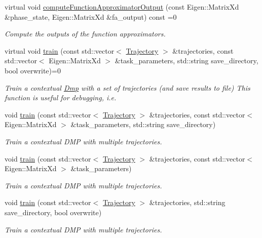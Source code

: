 \begin{DoxyCompactItemize}
virtual void \hyperlink{classDmpBbo_1_1DmpContextual_a768d6c4c35c804556afba0930cb25936}{compute\+Function\+Approximator\+Output} (const Eigen\+::\+Matrix\+Xd \&phase\+\_\+state, Eigen\+::\+Matrix\+Xd \&fa\+\_\+output) const =0
\begin{DoxyCompactList}\small\item\em Compute the outputs of the function approximators. \end{DoxyCompactList}\item 
virtual void \hyperlink{classDmpBbo_1_1DmpContextual_a08b158b7245e7fad5f187b4f2e3917d2}{train} (const std\+::vector$<$ \hyperlink{classDmpBbo_1_1Trajectory}{Trajectory} $>$ \&trajectories, const std\+::vector$<$ Eigen\+::\+Matrix\+Xd $>$ \&task\+\_\+parameters, std\+::string save\+\_\+directory, bool overwrite)=0
\begin{DoxyCompactList}\small\item\em Train a contextual \hyperlink{classDmpBbo_1_1Dmp}{Dmp} with a set of trajectories (and save results to file) This function is useful for debugging, i.\+e. \end{DoxyCompactList}\item 
void \hyperlink{classDmpBbo_1_1DmpContextual_a4e8cfe2363a4e80ffd210002f993eed5}{train} (const std\+::vector$<$ \hyperlink{classDmpBbo_1_1Trajectory}{Trajectory} $>$ \&trajectories, const std\+::vector$<$ Eigen\+::\+Matrix\+Xd $>$ \&task\+\_\+parameters, std\+::string save\+\_\+directory)
\begin{DoxyCompactList}\small\item\em Train a contextual D\+M\+P with multiple trajectories. \end{DoxyCompactList}\item 
void \hyperlink{classDmpBbo_1_1DmpContextual_a895da26e346c7d2c9f869b71cae01b29}{train} (const std\+::vector$<$ \hyperlink{classDmpBbo_1_1Trajectory}{Trajectory} $>$ \&trajectories, const std\+::vector$<$ Eigen\+::\+Matrix\+Xd $>$ \&task\+\_\+parameters)
\begin{DoxyCompactList}\small\item\em Train a contextual D\+M\+P with multiple trajectories. \end{DoxyCompactList}\item 
void \hyperlink{classDmpBbo_1_1DmpContextual_ad4b16613e821cd56035f3d74d6514c4c}{train} (const std\+::vector$<$ \hyperlink{classDmpBbo_1_1Trajectory}{Trajectory} $>$ \&trajectories, std\+::string save\+\_\+directory, bool overwrite)
\begin{DoxyCompactList}\small\item\em Train a contextual D\+M\+P with multiple trajectories. \end{DoxyCompactList}\item 

\end{DoxyCompactItemize}
